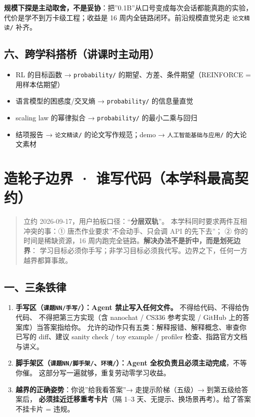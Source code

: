 \documentclass[
  chinese,
  11pt,
]{ctexart}
\providecommand{\tightlist}{%
  \setlength{\itemsep}{0pt}\setlength{\parskip}{0pt}}
\begin{document}
\textbf{规模下探是主动取舍，不是妥协}：把''0.1B''从口号变成每次会话都能真跑的实验， 代价是学不到万卡级工程；收益是 16 周内全链路闭环。前沿规模直觉另走 \texttt{论文精读/} 补齐。

\subsection{六、跨学科搭桥（讲课时主动用）}\label{ux516dux8de8ux5b66ux79d1ux642dux6865ux8bb2ux8bfeux65f6ux4e3bux52a8ux7528}

\begin{itemize}
\tightlist
\item
  RL 的目标函数 → \texttt{probability/} 的期望、方差、条件期望（REINFORCE = 用样本估期望）
\item
  语言模型的困惑度/交叉熵 → \texttt{probability/} 的信息量直觉
\item
  scaling law 的幂律拟合 → \texttt{probability/} 的最小二乘与回归
\item
  结项报告 → \texttt{论文精读/} 的论文写作规范；demo → \texttt{人工智能基础与应用/} 的大论文素材
\end{itemize}

\newpage

\section{造轮子边界 · 谁写代码（本学科最高契约）}\label{ux9020ux8f6eux5b50ux8fb9ux754c-ux8c01ux5199ux4ee3ux7801ux672cux5b66ux79d1ux6700ux9ad8ux5951ux7ea6}

\begin{quote}
立约 2026-09-17，用户拍板口径：``\textbf{分层双轨}''。 本学科同时要求两件互相冲突的事：① 唐杰作业要求''不会动手、只会调 API 的先下去''； ② 你的时间是稀缺资源，16 周内跑完全链路。\textbf{解决办法不是折中，而是划死边界}： 学习目标必须你手写；非学习目标必须我代写。边界之下，任何一方越界都算事故。
\end{quote}

\subsection{一、三条铁律}\label{ux4e00ux4e09ux6761ux94c1ux5f8b}

\begin{enumerate}
\def\labelenumi{\arabic{enumi}.}
\tightlist
\item
  \textbf{手写区（\texttt{课题NN/手写/}）：Agent 禁止写入任何文件。} 不得给代码、不得给伪代码、 不得把第三方实现（含 nanochat / CS336 参考实现 / GitHub 上的答案库）当答案指给你。 允许的动作只有五类：解释报错、解释概念、审查你已写的 diff、建议 sanity check / toy example / profiler 检查、指路官方文档与讲义。
\item
  \textbf{脚手架区（\texttt{课题NN/脚手架/}、\texttt{环境/}）：Agent 全权负责且必须主动完成}，不等你催。 这部分写一遍就够，重复劳动零学习收益。
\item
  \textbf{越界的正确姿势}：你说''给我看答案''→ 走提示阶梯（五级）→ 到第五级给答案后， \textbf{必须挂近迁移重考卡片}（隔 1--3 天、无提示、换场景再考）。给了答案不挂卡片 = 违规。
\end{enumerate}
\end{document}
